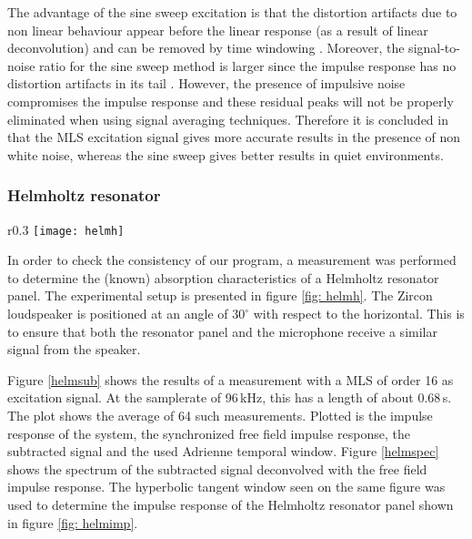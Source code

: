 The advantage of the sine sweep excitation is that the distortion artifacts due to non linear behaviour appear before the linear response (as a result of linear deconvolution) and can be removed by time windowing \cite{Geetere}.  Moreover, the signal-to-noise ratio for the sine sweep method is larger since the impulse response has no distortion artifacts in its tail \cite{Stan}.   However, the presence of impulsive noise compromises the impulse response and these residual peaks will not be properly eliminated when using signal averaging techniques. Therefore it is concluded in \cite{Stan} that the MLS excitation signal gives more accurate results in  the presence of non white noise, whereas the sine sweep gives better results in quiet environments. 






\subsubsection{Helmholtz resonator}

\begin{wrapfigure}{r}{0.3\textwidth}
  \centering
    \texttt{[image: helmh]}
  \caption{Experimental setup for the measurement of the characteristics of the Helmholtz resonator panel.}
  \label{fig: helmh}
\end{wrapfigure}
In order to check the consistency of our program, a measurement was performed to determine the (known) absorption characteristics of a Helmholtz resonator panel. The experimental setup is presented in figure \ref{fig: helmh}. The Zircon loudspeaker is positioned at an angle of $30^{\circ}$ with  respect to the horizontal. This is to ensure that both the resonator panel and the microphone receive a similar signal from the speaker.

Figure \ref{helmsub} shows the results of a measurement with a MLS of order 16 as excitation signal. At the samplerate of 96\,kHz, this has a length of about 0.68\,s. The plot shows the average of 64 such measurements. Plotted is the impulse response of the system, the synchronized free field impulse response, the subtracted signal and the used Adrienne temporal window. Figure \ref{helmspec} shows the spectrum of the subtracted signal deconvolved with the free field impulse response. The hyperbolic tangent window seen on the same figure was used to determine the impulse response of the Helmholtz resonator panel shown in figure \ref{fig: helmimp}.
 

